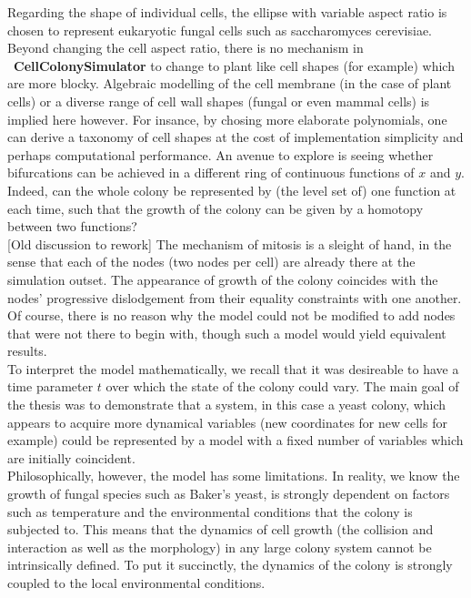 Regarding the shape of individual cells, 
the ellipse with variable aspect ratio is chosen to represent eukaryotic
fungal cells such as saccharomyces cerevisiae. Beyond changing 
the cell aspect ratio, there is no mechanism in \
\textbf{CellColonySimulator}
to change to plant like cell shapes (for example) which are more blocky.
Algebraic modelling of the cell membrane (in the case of plant cells) or
a diverse range of cell wall shapes (fungal or even mammal cells)
is implied here however. For insance, by chosing more elaborate
polynomials, one can derive a taxonomy of cell shapes at the cost of 
implementation simplicity and perhaps computational performance. 
An avenue to explore is seeing whether bifurcations
can be achieved in a different ring of continuous functions of $x$ and $y$.
Indeed, can the whole colony be represented by (the level set of) one function at each time,
such that the growth of the colony can be given by a homotopy 
between two functions?
\\

[Old discussion to rework]
The mechanism of mitosis is a sleight of hand, in the sense that
each of the nodes (two nodes per cell) are already there at the simulation
outset. The appearance of growth of the colony coincides with the nodes' progressive
dislodgement from their equality constraints with one another. Of course,
there is no reason why the model could not be modified to add nodes
that were not there to begin with, though such a model would yield
equivalent results.
\\

To interpret the model mathematically, we recall that it was desireable to have
a time parameter $t$ over which the state of the colony could vary. The main 
goal of the thesis was to demonstrate that a system, in this case a yeast colony,
which appears to acquire more dynamical variables (new coordinates for new cells for example)
could be represented by a model with a fixed number of variables which are
initially coincident.
\\

Philosophically, however, the model has some limitations. In reality, we know the growth
of fungal species such as Baker's yeast, is strongly dependent on factors such as temperature
and the environmental conditions that the colony is subjected to. This means 
that the dynamics of cell growth (the collision and interaction as well as the morphology) in 
any large colony system cannot be intrinsically defined. To put it succinctly, the dynamics of 
the colony is strongly coupled to the local environmental conditions.
\\

